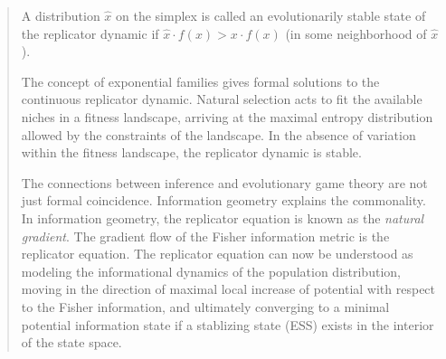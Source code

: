 \documentclass[a4paper,10pt]{article}
\begin{document}
\begin{quotation}
    A distribution $\hat{x}$ on the simplex is called an evolutionarily stable state of the replicator dynamic if $\hat{x} \cdot f(x) > x \cdot f(x)$ (in some neighborhood of $\hat{x}$).
    
    The concept of exponential families gives formal solutions
    to the continuous replicator dynamic.
    Natural selection acts to fit the available niches in a fitness landscape, arriving at the maximal entropy distribution allowed by the constraints of the landscape. In the absence of variation within the fitness landscape, the replicator dynamic is stable.
    
    The connections between inference and evolutionary game theory are not just formal coincidence.
    Information geometry explains the commonality.
    In information geometry, the replicator equation is known as the \emph{natural gradient}.
    The gradient flow of the Fisher information metric is the replicator equation.
    The replicator equation can now be understood as modeling the informational dynamics of the population distribution, moving in the direction of maximal local increase of potential with respect to the Fisher information, and ultimately converging to a minimal potential information state if a stablizing state (ESS) exists in the interior of the state space.
    
\end{quotation}

\\
\end{document}
